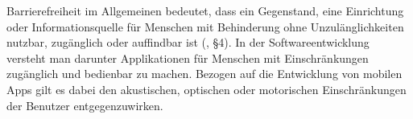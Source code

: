 
Barrierefreiheit im Allgemeinen bedeutet, dass ein Gegenstand, eine Einrichtung oder Informationsquelle für Menschen mit Behinderung ohne Unzulänglichkeiten nutzbar, zugänglich oder auffindbar ist (\cite{behindertengleichstellungsgesetz}, §4). In der Softwareentwicklung versteht man darunter Applikationen für Menschen mit Einschränkungen zugänglich und bedienbar zu machen. Bezogen auf die Entwicklung von  mobilen Apps gilt es dabei den akustischen, optischen oder motorischen Einschränkungen der Benutzer entgegenzuwirken. \\
